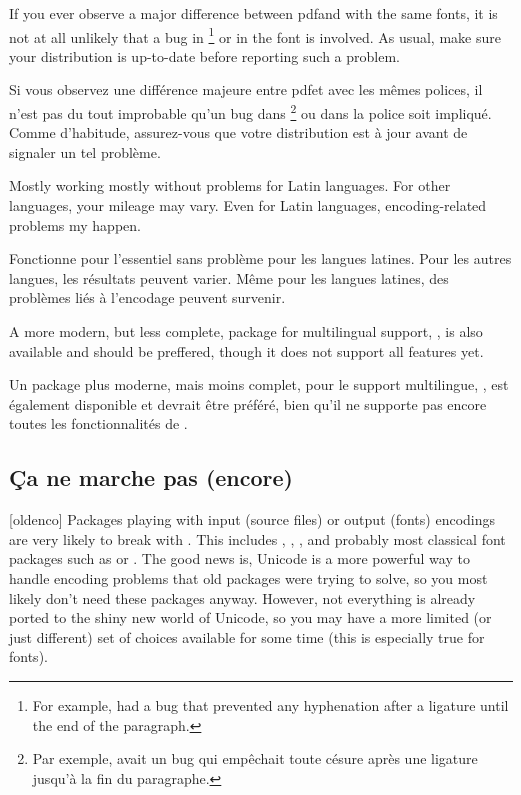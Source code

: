 \documentclass{lltxdoc}
\begin{document}
If you ever observe a major difference between pdf\latex and \lualatex with
the same fonts, it is not at all unlikely that a bug in \luatex\footnote{For
  example,  had a bug that prevented any hyphenation after a
  \code{-{}-{}-} ligature until the end of the paragraph.} or in the font is
involved. As usual, make sure your distribution is up-to-date before reporting
such a problem.

Si vous observez une différence majeure entre pdf\latex et \lualatex avec les mêmes polices, il n'est pas du tout improbable qu'un bug dans \luatex\footnote{Par exemple,  avait un bug qui empêchait toute césure après une ligature \code{-{}-{}-} jusqu'à la fin du paragraphe.} ou dans la police soit impliqué. Comme d'habitude, assurez-vous que votre distribution est à jour avant de signaler un tel problème.

Mostly working mostly without problems for Latin languages. For other
languages, your mileage may vary. Even for Latin languages, encoding-related
problems my happen.

Fonctionne pour l'essentiel sans problème pour les langues latines. Pour les autres langues, les résultats peuvent varier. Même pour les langues latines, des problèmes liés à l'encodage peuvent survenir.

A more modern, but less complete, package for multilingual support,
, is also available and should be preffered, though it does
not support all  features yet.

Un package plus moderne, mais moins complet, pour le support multilingue, , est également disponible et devrait être préféré, bien qu'il ne supporte pas encore toutes les fonctionnalités de .

\subsection{Ça ne marche pas (encore)}\label{notworking}

[oldenco] Packages playing with input (source files) or
output (fonts) encodings are very likely to break with \luatex. This includes
, , , and probably most classical font
packages such as  or . The good news
is, Unicode is a more powerful way to handle encoding problems that old
packages were trying to solve, so you most likely don't need these packages
anyway. However, not everything is already ported to the shiny new world of
Unicode, so you may have a more limited (or just different) set of choices
available for some time (this is especially true for fonts).
\end{document}
